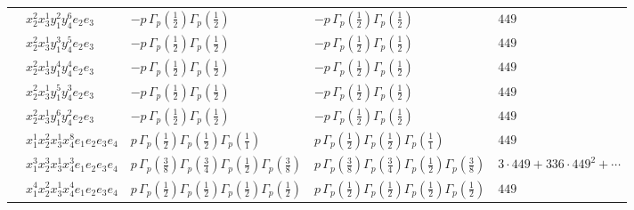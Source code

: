 \documentclass[11pt]{article}
\begin{document}
\begin{table}[ht]
{\begin{tabular}{@{}lllll@{}}
 & $x_{2}^{2} x_{3}^{1} y_{1}^{2} y_{4}^{6} e_{2} e_{3}$ & $- p \, \Gamma_p \left( \frac{1}{2} \right) \Gamma_p \left( \frac{1}{2} \right)$ & $- p \, \Gamma_p \left( \frac{1}{2} \right) \Gamma_p \left( \frac{1}{2} \right)$ & $449$ \\
 & $x_{2}^{2} x_{3}^{1} y_{1}^{3} y_{4}^{5} e_{2} e_{3}$ & $- p \, \Gamma_p \left( \frac{1}{2} \right) \Gamma_p \left( \frac{1}{2} \right)$ & $- p \, \Gamma_p \left( \frac{1}{2} \right) \Gamma_p \left( \frac{1}{2} \right)$ & $449$ \\
 & $x_{2}^{2} x_{3}^{1} y_{1}^{4} y_{4}^{4} e_{2} e_{3}$ & $- p \, \Gamma_p \left( \frac{1}{2} \right) \Gamma_p \left( \frac{1}{2} \right)$ & $- p \, \Gamma_p \left( \frac{1}{2} \right) \Gamma_p \left( \frac{1}{2} \right)$ & $449$ \\
 & $x_{2}^{2} x_{3}^{1} y_{1}^{5} y_{4}^{3} e_{2} e_{3}$ & $- p \, \Gamma_p \left( \frac{1}{2} \right) \Gamma_p \left( \frac{1}{2} \right)$ & $- p \, \Gamma_p \left( \frac{1}{2} \right) \Gamma_p \left( \frac{1}{2} \right)$ & $449$ \\
 & $x_{2}^{2} x_{3}^{1} y_{1}^{6} y_{4}^{2} e_{2} e_{3}$ & $- p \, \Gamma_p \left( \frac{1}{2} \right) \Gamma_p \left( \frac{1}{2} \right)$ & $- p \, \Gamma_p \left( \frac{1}{2} \right) \Gamma_p \left( \frac{1}{2} \right)$ & $449$ \\
 & $x_{1}^{1} x_{2}^{2} x_{3}^{1} x_{4}^{8}  e_{1} e_{2} e_{3} e_{4}$ & $p \, \Gamma_p \left( \frac{1}{2} \right) \Gamma_p \left( \frac{1}{2} \right) \Gamma_p \left( \frac{1}{1} \right)$ & $p \, \Gamma_p \left( \frac{1}{2} \right) \Gamma_p \left( \frac{1}{2} \right) \Gamma_p \left( \frac{1}{1} \right)$ & $449$ \\
 & $x_{1}^{3} x_{2}^{3} x_{3}^{1} x_{4}^{3}  e_{1} e_{2} e_{3} e_{4}$ & $p \, \Gamma_p \left( \frac{3}{8} \right) \Gamma_p \left( \frac{3}{4} \right) \Gamma_p \left( \frac{1}{2} \right) \Gamma_p \left( \frac{3}{8} \right)$ & $p \, \Gamma_p \left( \frac{3}{8} \right) \Gamma_p \left( \frac{3}{4} \right) \Gamma_p \left( \frac{1}{2} \right) \Gamma_p \left( \frac{3}{8} \right)$ & $3{\cdot}449{+}336{\cdot}449^{2}{+}\cdots$ \\
 & $x_{1}^{4} x_{2}^{2} x_{3}^{1} x_{4}^{4}  e_{1} e_{2} e_{3} e_{4}$ & $p \, \Gamma_p \left( \frac{1}{2} \right) \Gamma_p \left( \frac{1}{2} \right) \Gamma_p \left( \frac{1}{2} \right) \Gamma_p \left( \frac{1}{2} \right)$ & $p \, \Gamma_p \left( \frac{1}{2} \right) \Gamma_p \left( \frac{1}{2} \right) \Gamma_p \left( \frac{1}{2} \right) \Gamma_p \left( \frac{1}{2} \right)$ & $449$ \\

\end{tabular}}
\end{table}
\end{document}
